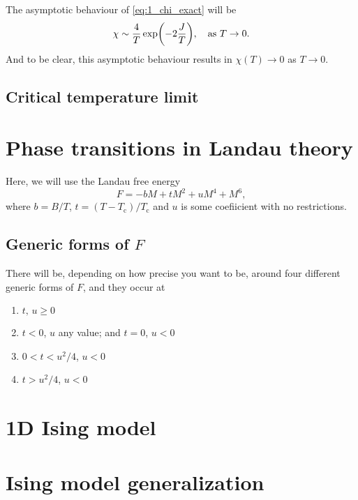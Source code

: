 \documentclass[11pt,letter, swedish, english
]{article}
\newcommand{\Tc}{\ensuremath{T_{\text{c}}}}
\begin{document}
The asymptotic behaviour of \eqref{eq:1_chi_exact} will be 
\begin{equation}
\chi\sim \frac{4}{T}\exp(-2\frac{J}{T})
\qcomma \text{as}\ T\to0.
\end{equation}
And to be clear, this asymptotic behaviour results in $\chi(T)\to0$ as
$T\to0$. 


\subsection{Critical temperature limit}






\section{Phase transitions in Landau theory}
\renewcommand{\thesubsection}{\arabic{section} (\alph{subsection})}
\renewcommand{\thesubsubsection}{\arabic{section} (\alph{subsection},\,\roman{subsubsection})}

Here, we will use the Landau free energy
\begin{equation}
F=-bM+tM^2+uM^4+M^6,
\end{equation}
where $b=B/T$, $t=(T-\Tc)/\Tc$ and $u$ is some coefiicient with no
restrictions. 

\subsection{Generic forms of $F$}
There will be, depending on how precise you want to be, around four
different generic forms of $F$, and they occur at
\begin{enumerate}[label=\roman*.]
\item $t,\,u\ge0$ %
\item $t<0$, $u$ any value; and $t=0$, $u<0$
\item $0<t<u^2/4$, $u<0$
\item $t>u^2/4$, $u<0$
\end{enumerate}



\section{1D Ising model}



\section{Ising model generalization}
\end{document}
